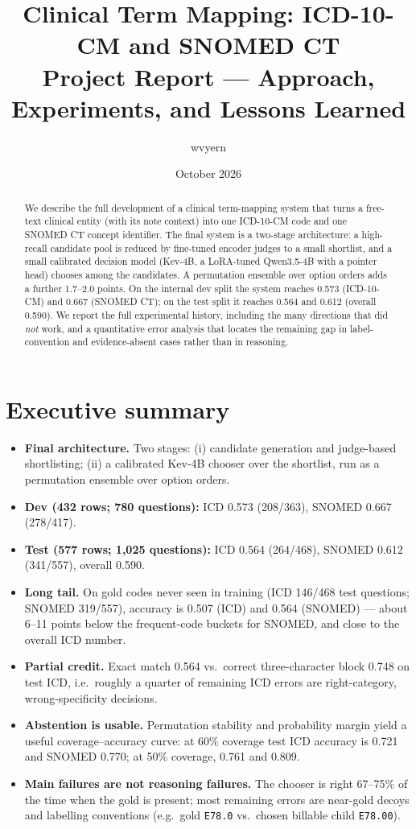 \documentclass[11pt]{article}
\title{\textbf{Clinical Term Mapping: ICD-10-CM and SNOMED CT}\\[2pt]
\large Project Report --- Approach, Experiments, and Lessons Learned}
\author{wvyern}
\date{October 2026}
\newcommand{\code}[1]{\texttt{#1}}
\begin{document}
\maketitle

\begin{abstract}
We describe the full development of a clinical term-mapping system that turns a free-text
clinical entity (with its note context) into one ICD-10-CM code and one SNOMED CT concept
identifier. The final system is a two-stage architecture: a high-recall candidate pool is
reduced by fine-tuned encoder judges to a small shortlist, and a small calibrated decision
model (Kev-4B, a LoRA-tuned Qwen3.5-4B with a pointer head) chooses among the candidates.
A permutation ensemble over option orders adds a further 1.7--2.0 points. On the internal
dev split the system reaches 0.573 (ICD-10-CM) and 0.667 (SNOMED CT); on the test split it
reaches 0.564 and 0.612 (overall 0.590). We report the full experimental history, including
the many directions that did \emph{not} work, and a quantitative error analysis that locates
the remaining gap in label-convention and evidence-absent cases rather than in reasoning.
\end{abstract}

\section{Executive summary}
\begin{itemize}[leftmargin=1.2em]
  \item \textbf{Final architecture.} Two stages: (i) candidate generation and judge-based
  shortlisting; (ii) a calibrated Kev-4B chooser over the shortlist, run as a permutation
  ensemble over option orders.
  \item \textbf{Dev (432 rows; 780 questions):} ICD 0.573 (208/363), SNOMED 0.667 (278/417).
  \item \textbf{Test (577 rows; 1{,}025 questions):} ICD 0.564 (264/468), SNOMED 0.612
  (341/557), overall 0.590.
  \item \textbf{Long tail.} On gold codes never seen in training (ICD 146/468 test questions;
  SNOMED 319/557), accuracy is 0.507 (ICD) and 0.564 (SNOMED) --- about 6--11 points below
  the frequent-code buckets for SNOMED, and close to the overall ICD number.
  \item \textbf{Partial credit.} Exact match 0.564 vs.\ correct three-character block 0.748
  on test ICD, i.e.\ roughly a quarter of remaining ICD errors are right-category,
  wrong-specificity decisions.
  \item \textbf{Abstention is usable.} Permutation stability and probability margin yield a
  useful coverage--accuracy curve: at 60\% coverage test ICD accuracy is 0.721 and SNOMED
  0.770; at 50\% coverage, 0.761 and 0.809.
  \item \textbf{Main failures are not reasoning failures.} The chooser is right 67--75\% of
  the time when the gold is present; most remaining errors are near-gold decoys and
  labelling conventions (e.g.\ gold \code{E78.0} vs.\ chosen billable child \code{E78.00}).
\end{itemize}
\end{document}
